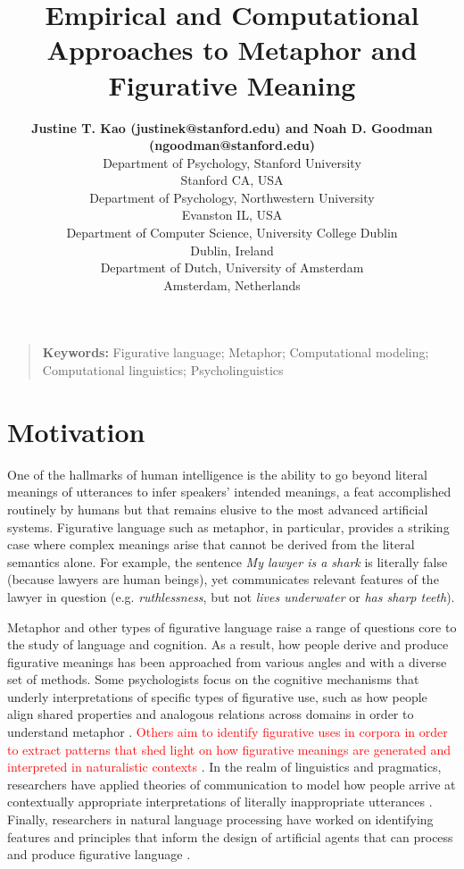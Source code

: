 \documentclass[10pt,letterpaper]{article}
\title{Empirical and Computational Approaches to Metaphor and Figurative Meaning}
\author{{\large \bf Justine T. Kao (justinek@stanford.edu) and Noah D. Goodman (ngoodman@stanford.edu)} \\ 
  Department of Psychology, 
  Stanford University \\ Stanford CA, USA 
  \AND {\large \bf Francisco Maravilla (fmaravil@gmail.com) and Dedre Gentner (gentner@northwestern.edu)} \\
  Department of Psychology, Northwestern University \\
  Evanston IL, USA
  \AND {\large \bf Tony Veale (tony.veale@ucd.ie)} \\
  Department of Computer Science, University College Dublin\\
  Dublin, Ireland
    \AND {\large \bf Gerard Steen (g.j.steen@uva.nl)} \\
  Department of Dutch, University of Amsterdam \\
Amsterdam, Netherlands
  }
\begin{document}
\maketitle

\begin{quote}
\small
\textbf{Keywords:} 
Figurative language; Metaphor; Computational modeling; Computational linguistics; Psycholinguistics
\end{quote}

\section{Motivation}
One of the hallmarks of human intelligence is the ability to go beyond literal meanings of utterances to infer speakers' intended meanings, a feat accomplished routinely by humans but that remains elusive to the most advanced artificial systems. Figurative language such as metaphor, in particular, provides a striking case where complex meanings arise that cannot be derived from the literal semantics alone. For example, the sentence \emph{My lawyer is a shark} is literally false (because lawyers are human beings), yet communicates relevant features of the lawyer in question (e.g. \emph{ruthlessness}, but not \emph{lives underwater} or \emph{has sharp teeth}). 


Metaphor and other types of figurative language raise a range of questions core to the study of language and cognition. As a result, how people derive and produce figurative meanings has been approached from various angles and with a diverse set of methods. Some psychologists focus on the cognitive mechanisms that underly interpretations of specific types of figurative use, such as how people align shared properties and analogous relations across domains in order to understand metaphor \cite{gentner1983structure, gentner2001metaphor}. 
\textcolor{red}{Others aim to identify figurative uses in corpora in order to extract patterns that shed light on how figurative meanings are generated and interpreted in naturalistic contexts \cite{steen2010method}}. In the realm of linguistics and pragmatics, researchers have applied theories of communication to model how people arrive at contextually appropriate interpretations of literally inappropriate utterances \cite{kao2014nonliteral, wilson2006metaphor}. Finally, researchers in natural language processing have worked on identifying features and principles that inform the design of artificial agents that can process and produce figurative language \cite{veale2000computation, veale2007comprehending}.
\end{document}
